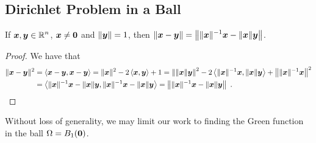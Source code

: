 \subsection{Dirichlet Problem in a Ball}

\begin{lemma} \label{laplace_diric_ball}
If $\displaystyle {\bm{x}}, {\bm{y}} \in \mathbb{R}^n$, ${\bm{x}} \neq {\bm{0}}$ and
$\|{\bm{y}}\|=1$, then
$\displaystyle \|{\bm{x}}-{\bm{y}}\|
= \left\|\|{\bm{x}}\|^{-1} {\bm{x}} - \|{\bm{x}}\| {\bm{y}}\right\|$.
\end{lemma}

\begin{proof}
We have that
\begin{align*}
\|{\bm{x}}-{\bm{y}}\|^2 &= \left\langle{{\bm{x}}-{\bm{y}}} , {{\bm{x}}-{\bm{y}}}\right\rangle
= \|{\bm{x}}\|^2 - 2 \left\langle{{\bm{x}}} , {{\bm{y}}}\right\rangle + 1
= \left\| \|{\bm{x}}\|{\bm{y}}\right\|^2  - 2
\left\langle{\|{\bm{x}}\|^{-1}{\bm{x}}} , {\|{\bm{x}}\|{\bm{y}}}\right\rangle +
\left\|\|{\bm{x}}\|^{-1}{\bm{x}}\right\|^2 \\
&= \left\langle{\|{\bm{x}}\|^{-1} {\bm{x}} - \|{\bm{x}}\|{\bm{y}}} , {\|{\bm{x}}\|^{-1} {\bm{x}} - \|{\bm{x}}\|{\bm{y}}}\right\rangle
= \left\|\|{\bm{x}}\|^{-1} {\bm{x}} - \|{\bm{x}}\|
  {\bm{y}}\right\| \ .  \qedhere
\end{align*}
\end{proof}

Without loss of generality, we may limit our work to finding the Green
function in the ball $\Omega = B_1({\bm{0}})$.

